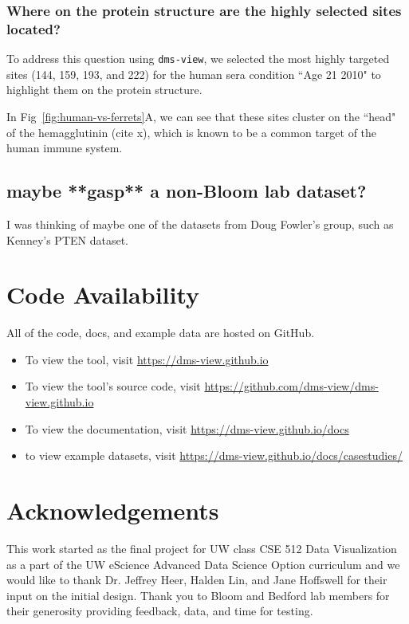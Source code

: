 \subsubsection{Where on the protein structure are the highly selected sites located?}

To address this question using \texttt{dms-view}, we selected the most highly targeted sites (144, 159, 193, and 222) for the human sera condition ``Age 21 2010" to highlight them on the protein structure.

In Fig~\ref{fig:human-vs-ferrets}A, we can see that these sites cluster on the ``head" of the hemagglutinin (cite x), which is known to be a common target of the human immune system.

\subsection{maybe **gasp** a non-Bloom lab dataset?}

I was thinking of maybe one of the datasets from Doug Fowler's group, such as Kenney's PTEN dataset.

\section{Code Availability}

All of the code, docs, and example data are hosted on GitHub.

\begin{itemize}
  \item To view the tool, visit \url{https://dms-view.github.io}
  \item To view the tool's source code, visit \url{https://github.com/dms-view/dms-view.github.io}
  \item To view the documentation, visit \url{https://dms-view.github.io/docs}
  \item to view example datasets, visit \url{https://dms-view.github.io/docs/casestudies/}
\end{itemize}

\section{Acknowledgements}

This work started as the final project for UW class CSE 512 Data Visualization as a part of the UW eScience Advanced Data Science Option curriculum and we would like to thank Dr. Jeffrey Heer, Halden Lin, and Jane Hoffswell for their input on the initial design.
Thank you to Bloom and Bedford lab members for their generosity providing feedback, data, and time for testing.

